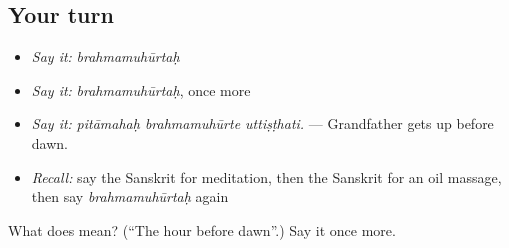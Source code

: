 \subsection*{Your turn}
\begin{itemize}
\raggedright
  \item \emph{Say it:} \emph{brahmamuhūrtaḥ}
  \item \emph{Say it:} \emph{brahmamuhūrtaḥ}, once more
  \item \emph{Say it:} \emph{pitāmahaḥ brahmamuhūrte uttiṣṭhati.} — Grandfather gets up before dawn.
  \item \emph{Recall:} say the Sanskrit for meditation, then the Sanskrit for an oil massage, then say \emph{brahmamuhūrtaḥ} again
\end{itemize}

\begin{tcolorbox}[breakable,colback=teal!4,colframe=teal!35!black,title={Before you move on}]
What does  mean? (\textquotedblleft{}The hour before dawn\textquotedblright{}.) Say it once more.
\end{tcolorbox}
